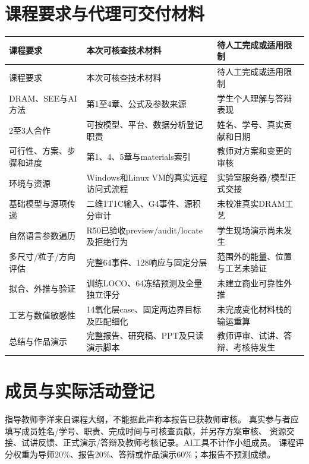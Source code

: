 \section{课程要求与代理可交付材料}
\small
\begin{longtable}{p{}p{}p{}}
\toprule 课程要求&本次可核查技术材料&待人工完成或适用限制\\\midrule
\endfirsthead\toprule 课程要求&本次可核查技术材料&待人工完成或适用限制\\\midrule\endhead
DRAM、SEE与AI方法&第1至4章、公式及参数来源&学生个人理解与答辩表现\\
2至3人合作&可按模型、平台、数据分析登记职责&姓名、学号、真实贡献和日期\\
可行性、方案、步骤和进度&第1、4、5章与materials索引&教师对方案和变更的审核\\
环境与资源&Windows和Linux VM的真实远程访问式流程&实验室服务器/模型正式交接\\
基础模型与源项传递&二维1T1C输入、G4事件、源积分审计&未校准真实DRAM工艺\\
自然语言参数遍历&R50已验收preview/audit/locate及拒绝行为&学生现场演示尚未发生\\
多尺寸/粒子/方向评估&完整64事件、128响应与固定分层&范围外的能量、位置与工艺未验证\\
拟合、外推与验证&训练LOCO、64冻结预测及全量独立评分&未建立商业可靠性外推\\
工艺与数值敏感性&14氧化层case、固定两边界目标及匹配细化&未完成变化材料栈的输运重算\\
总结与作品演示&完整报告、研究稿、PPT及只读演示脚本&教师评审、试讲、答辩、考核待发生\\
\bottomrule\end{longtable}\normalsize
\section{成员与实际活动登记}
指导教师李洋来自课程大纲，不能据此声称本报告已获教师审核。
真实参与者应填写成员姓名/学号、职责、完成时间与可核查贡献，并另存方案审核、
资源交接、试讲反馈、正式演示/答辩及教师考核记录。AI工具不计作小组成员。
课程评分权重为导师20\%、报告20\%、答辩或作品演示60\%；本报告不预测成绩。

